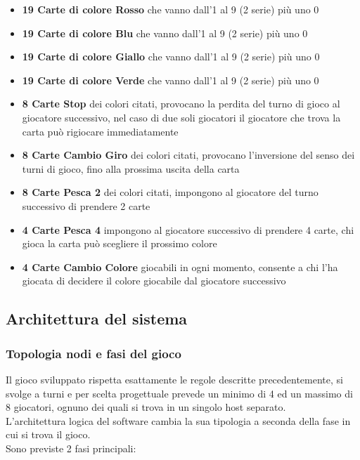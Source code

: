 \documentclass[10pt,a4paper]{article}
\begin{document}
\begin{itemize}
\item \textbf{19 Carte di colore Rosso} che vanno dall'1 al 9 (2 serie) più uno 0
\item \textbf{19 Carte di colore Blu} che vanno dall'1 al 9 (2 serie) più uno 0
\item \textbf{19 Carte di colore Giallo} che vanno dall'1 al 9 (2 serie) più uno 0
\item \textbf{19 Carte di colore Verde} che vanno dall'1 al 9 (2 serie) più uno 0

\item \textbf{8  Carte Stop} dei colori citati, provocano la perdita del turno di gioco al giocatore successivo, nel caso di due soli giocatori il giocatore che trova la carta può rigiocare immediatamente
\item \textbf{8  Carte Cambio Giro} dei colori citati, provocano l'inversione del senso dei turni di gioco, fino alla prossima uscita della carta
\item \textbf{8  Carte Pesca 2} dei colori citati, impongono al giocatore del turno successivo di prendere 2 carte

\item \textbf{4 Carte Pesca 4} impongono al giocatore successivo di prendere 4 carte, chi gioca la carta può scegliere il prossimo colore
\item \textbf{4 Carte Cambio Colore} giocabili in ogni momento, consente a chi l'ha giocata di decidere il colore giocabile dal giocatore successivo
\end{itemize}


\subsection{Architettura del sistema}

\subsubsection{Topologia nodi e fasi del gioco}
Il gioco sviluppato rispetta esattamente le regole descritte precedentemente, si svolge a turni e per scelta progettuale prevede un minimo di 4 ed un massimo di 8 giocatori, ognuno dei quali si trova in un singolo host separato.\\ L'architettura logica del software cambia la sua tipologia a seconda della fase in cui si trova il gioco.\\ Sono previste 2 fasi principali: 
\end{document}
